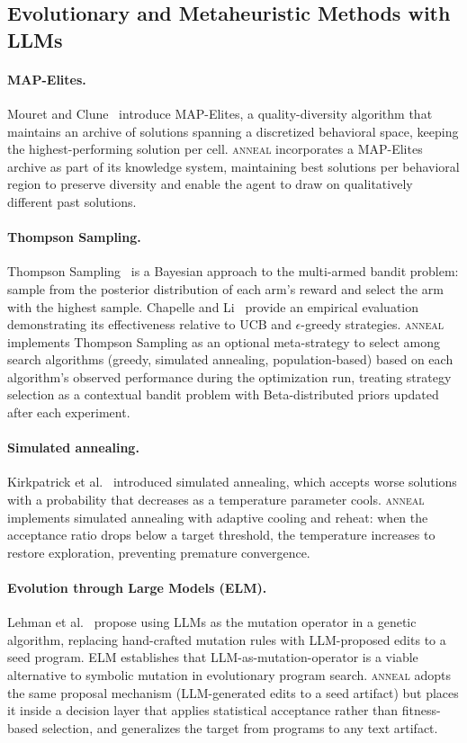 \subsection{Evolutionary and Metaheuristic Methods with LLMs}

\paragraph{MAP-Elites.}
Mouret and Clune~\cite{mouret2015mapelites} introduce MAP-Elites, a quality-diversity algorithm that maintains an archive of solutions spanning a discretized behavioral space, keeping the highest-performing solution per cell.
\textsc{anneal} incorporates a MAP-Elites archive as part of its knowledge system, maintaining best solutions per behavioral region to preserve diversity and enable the agent to draw on qualitatively different past solutions.

\paragraph{Thompson Sampling.}
Thompson Sampling~\cite{thompson1933likelihood} is a Bayesian approach to the multi-armed bandit problem: sample from the posterior distribution of each arm's reward and select the arm with the highest sample.
Chapelle and Li~\cite{chapelle2011empirical} provide an empirical evaluation demonstrating its effectiveness relative to UCB and $\epsilon$-greedy strategies.
\textsc{anneal} implements Thompson Sampling as an optional meta-strategy to select among search algorithms (greedy, simulated annealing, population-based) based on each algorithm's observed performance during the optimization run, treating strategy selection as a contextual bandit problem with Beta-distributed priors updated after each experiment.

\paragraph{Simulated annealing.}
Kirkpatrick et al.~\cite{kirkpatrick1983sa} introduced simulated annealing, which accepts worse solutions with a probability that decreases as a temperature parameter cools.
\textsc{anneal} implements simulated annealing with adaptive cooling and reheat: when the acceptance ratio drops below a target threshold, the temperature increases to restore exploration, preventing premature convergence.

\paragraph{Evolution through Large Models (ELM).}
Lehman et al.~\cite{lehman2023elm} propose using LLMs as the mutation operator in a genetic algorithm, replacing hand-crafted mutation rules with LLM-proposed edits to a seed program.
ELM establishes that LLM-as-mutation-operator is a viable alternative to symbolic mutation in evolutionary program search.
\textsc{anneal} adopts the same proposal mechanism (LLM-generated edits to a seed artifact) but places it inside a decision layer that applies statistical acceptance rather than fitness-based selection, and generalizes the target from programs to any text artifact.

